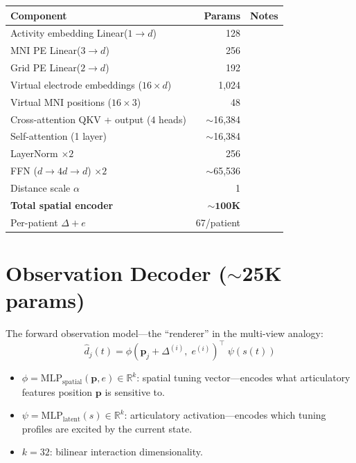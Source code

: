 \documentclass[11pt,letterpaper]{article}
\newcommand{\bfp}{\mathbf{p}}
\newcommand{\R}{\mathbb{R}}
\begin{document}
\begin{table}[h]\centering\small
\begin{tabular}{@{}lrl@{}}
\toprule
\textbf{Component} & \textbf{Params} & \textbf{Notes} \\
\midrule
Activity embedding Linear($1 \to d$) & 128 & \\
MNI PE Linear($3 \to d$) & 256 & \\
Grid PE Linear($2 \to d$) & 192 & \\
Virtual electrode embeddings ($16 \times d$) & 1,024 & \\
Virtual MNI positions ($16 \times 3$) & 48 & \\
Cross-attention QKV + output ($4$ heads) & ${\sim}$16,384 & \\
Self-attention (1 layer) & ${\sim}$16,384 & \\
LayerNorm $\times 2$ & 256 & \\
FFN ($d \to 4d \to d$) $\times 2$ & ${\sim}$65,536 & \\
Distance scale $\alpha$ & 1 & \\
\midrule
\textbf{Total spatial encoder} & $\mathbf{{\sim}100}$\textbf{K} & \\
Per-patient $\Delta + e$ & 67/patient & \\
\bottomrule
\end{tabular}
\end{table}


\section{Observation Decoder (${\sim}$25K params)}\label{sec:obs-decoder}

The forward observation model---the ``renderer'' in the multi-view analogy:
\begin{equation}\label{eq:bilinear}
\boxed{\hat{d}_j(t) = \phi(\bfp_j + \Delta^{(i)},\; e^{(i)})^\top \;\psi(s(t))}
\end{equation}
\begin{itemize}[leftmargin=2em]
\item $\phi = \text{MLP}_{\text{spatial}}(\bfp, e) \in \R^k$: spatial tuning vector---encodes what articulatory features position $\bfp$ is sensitive to.
\item $\psi = \text{MLP}_{\text{latent}}(s) \in \R^k$: articulatory activation---encodes which tuning profiles are excited by the current state.
\item $k = 32$: bilinear interaction dimensionality.
\end{itemize}
\end{document}
